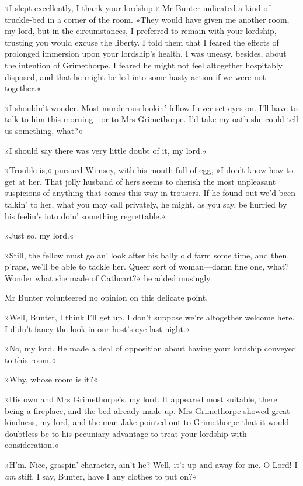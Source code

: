 »I slept excellently, I thank your lordship.« Mr Bunter indicated a kind of truckle-bed in a corner of the room. »They would have given me another room, my lord, but in the circumstances, I preferred to remain with your lordship, trusting you would excuse the liberty. I told them that I feared the effects of prolonged immersion upon your lordship's health. I was uneasy, besides, about the intention of Grimethorpe. I feared he might not feel altogether hospitably disposed, and that he might be led into some hasty action if we were not together.«

»I shouldn't wonder. Most murderous-lookin' fellow I ever set eyes on.  I'll have to talk to him this morning—or to Mrs Grimethorpe. I'd take my oath she could tell us something, what?«

»I should say there was very little doubt of it, my lord.«

»Trouble is,« pursued Wimsey, with his mouth full of egg, »I don't know how to get at her. That jolly husband of hers seems to cherish the most unpleasant suspicions of anything that comes this way in trousers. If he found out we'd been talkin' to her, what you may call privately, he might, as you say, be hurried by his feelin's into doin' something regrettable.«

»Just so, my lord.«

»Still, the fellow must go an' look after his bally old farm some time, and then, p'raps, we'll be able to tackle her. Queer sort of woman—damn fine one, what? Wonder what she made of Cathcart?« he added musingly.

Mr Bunter volunteered no opinion on this delicate point.

»Well, Bunter, I think I'll get up. I don't suppose we're altogether welcome here. I didn't fancy the look in our host's eye last night.«

»No, my lord. He made a deal of opposition about having your lordship conveyed to this room.«

»Why, whose room is it?«

»His own and Mrs Grimethorpe's, my lord. It appeared most suitable, there being a fireplace, and the bed already made up. Mrs Grimethorpe showed great kindness, my lord, and the man Jake pointed out to Grimethorpe that it would doubtless be to his pecuniary advantage to treat your lordship with consideration.«

»H'm. Nice, graspin' character, ain't he? Well, it's up and away for me. O Lord! I \textit{am} stiff. I say, Bunter, have I any clothes to put on?«

